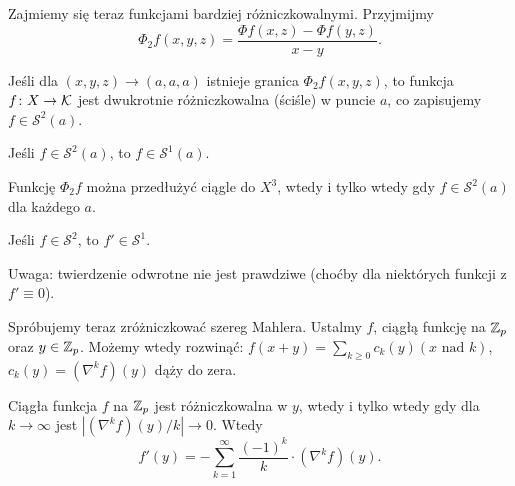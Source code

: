 Zajmiemy  się teraz funkcjami bardziej różniczkowalnymi.
Przyjmijmy
\[
	\Phi_2 f(x, y, z) = \frac{\Phi f(x,z) - \Phi f(y, z)}{x-y}.
\]

\begin{definicja}
	Jeśli dla $(x, y, z) \to (a,a,a)$ istnieje granica $\Phi_2 f(x,y,z)$, to funkcja $f \colon X \to \mathcal K$ jest dwukrotnie różniczkowalna (ściśle) w puncie $a$, co zapisujemy $f \in \mathcal S^2(a)$.
\end{definicja}

\begin{fakt}
	Jeśli $f \in \mathcal S^2(a)$, to $f \in \mathcal S^1(a)$.
\end{fakt}

\begin{definicja}
	Funkcję $\Phi_2f$ można przedłużyć ciągle do $X^3$, wtedy i tylko wtedy gdy $f \in \mathcal S^2(a)$ dla każdego $a$.
\end{definicja}

\begin{fakt}
	Jeśli $f \in \mathcal S^2$, to $f' \in \mathcal S^1$.
\end{fakt}

Uwaga: twierdzenie odwrotne nie jest prawdziwe (choćby dla niektórych funkcji z $f' \equiv 0$).

Spróbujemy  teraz zróżniczkować szereg Mahlera.
Ustalmy $f$, ciągłą funkcję na $\mathbb Z_p$ oraz $y \in \mathbb Z_p$.
Możemy wtedy rozwinąć: $f(x+y) = \sum_{k \ge 0} c_k(y) (x \mbox { nad } k)$, $c_k(y) = (\nabla^k f)(y)$ dąży do zera.

\begin{fakt}
	Ciągła funkcja $f$ na $\mathbb Z_p$ jest różniczkowalna w $y$, wtedy i tylko wtedy gdy dla $k \to \infty$ jest $|(\nabla^k f)(y) / k| \to 0$.
	Wtedy
	\[
		f'(y) = - \sum_{k=1}^\infty \frac{(-1)^k }{k} \cdot (\nabla^k f)(y).
	\]
\end{fakt}

